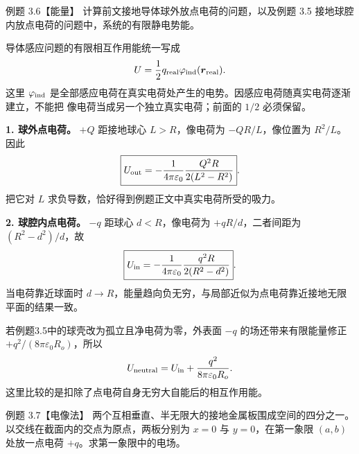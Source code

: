 \begin{origexamplebox}{例题 3.6【能量】}
计算前文接地导体球外放点电荷的问题，以及例题 3.5 接地球腔内放点电荷的问题中，系统的有限静电势能。
\end{origexamplebox}

\begin{xesolution}
导体感应问题的有限相互作用能统一写成
\[
  U=\frac12q_{\rm real}\varphi_{\rm ind}(\boldsymbol r_{\rm real}).
\]
这里 $\varphi_{\rm ind}$ 是全部感应电荷在真实电荷处产生的电势。因感应电荷随真实电荷逐渐建立，不能把
像电荷当成另一个独立真实电荷；前面的 $1/2$ 必须保留。

\textbf{1. 球外点电荷。} $+Q$ 距接地球心 $L>R$，像电荷为 $-QR/L$，像位置为 $R^2/L$。因此
\[
  \boxed{U_{\rm out}=-\frac1{4\pi\varepsilon_0}
  \frac{Q^2R}{2(L^2-R^2)}}.
\]
把它对 $L$ 求负导数，恰好得到例题正文中真实电荷所受的吸力。

\textbf{2. 球腔内点电荷。} $-q$ 距球心 $d<R$，像电荷为 $+qR/d$，二者间距为
$(R^2-d^2)/d$，故
\[
  \boxed{U_{\rm in}=-\frac1{4\pi\varepsilon_0}
  \frac{q^2R}{2(R^2-d^2)}}.
\]
当电荷靠近球面时 $d\to R$，能量趋向负无穷，与局部近似为点电荷靠近接地无限平面的结果一致。

若例题3.5中的球壳改为孤立且净电荷为零，外表面 $-q$ 的场还带来有限能量修正
$+q^2/(8\pi\varepsilon_0R_o)$，所以
\[
  U_{\rm neutral}=U_{\rm in}+\frac{q^2}{8\pi\varepsilon_0R_o}.
\]
这里比较的是扣除了点电荷自身无穷大自能后的相互作用能。
\end{xesolution}

\begin{origexamplebox}{例题 3.7【电像法】}
两个互相垂直、半无限大的接地金属板围成空间的四分之一。以交线在截面内的交点为原点，两板分别为
$x=0$ 与 $y=0$，在第一象限 $(a,b)$ 处放一点电荷 $+q$。求第一象限中的电场。
\emCornerQuestion
{}\label{fig:em-source-thirty-fourth-section-7}
\end{origexamplebox}

